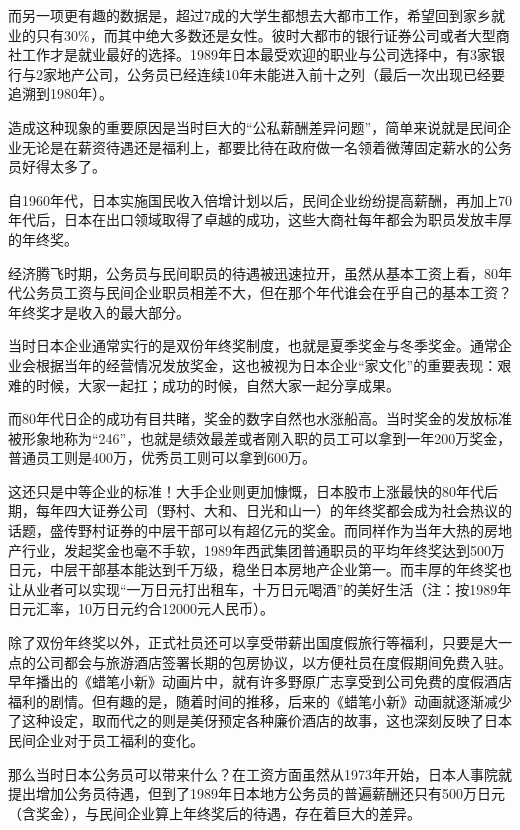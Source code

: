 而另一项更有趣的数据是，超过7成的大学生都想去大都市工作，希望回到家乡就业的只有30\%，而其中绝大多数还是女性。彼时大都市的银行证券公司或者大型商社工作才是就业最好的选择。1989年日本最受欢迎的职业与公司选择中，有3家银行与2家地产公司，公务员已经连续10年未能进入前十之列（最后一次出现已经要追溯到1980年）。

造成这种现象的重要原因是当时巨大的“公私薪酬差异问题”，简单来说就是民间企业无论是在薪资待遇还是福利上，都要比待在政府做一名领着微薄固定薪水的公务员好得太多了。

自1960年代，日本实施国民收入倍增计划以后，民间企业纷纷提高薪酬，再加上70年代后，日本在出口领域取得了卓越的成功，这些大商社每年都会为职员发放丰厚的年终奖。

经济腾飞时期，公务员与民间职员的待遇被迅速拉开，虽然从基本工资上看，80年代公务员工资与民间企业职员相差不大，但在那个年代谁会在乎自己的基本工资？年终奖才是收入的最大部分。

当时日本企业通常实行的是双份年终奖制度，也就是夏季奖金与冬季奖金。通常企业会根据当年的经营情况发放奖金，这也被视为日本企业“家文化”的重要表现：艰难的时候，大家一起扛；成功的时候，自然大家一起分享成果。

而80年代日企的成功有目共睹，奖金的数字自然也水涨船高。当时奖金的发放标准被形象地称为“246”，也就是绩效最差或者刚入职的员工可以拿到一年200万奖金，普通员工则是400万，优秀员工则可以拿到600万。

这还只是中等企业的标准！大手企业则更加慷慨，日本股市上涨最快的80年代后期，每年四大证券公司（野村、大和、日光和山一）的年终奖都会成为社会热议的话题，盛传野村证券的中层干部可以有超亿元的奖金。而同样作为当年大热的房地产行业，发起奖金也毫不手软，1989年西武集团普通职员的平均年终奖达到500万日元，中层干部基本能达到千万级，稳坐日本房地产企业第一。而丰厚的年终奖也让从业者可以实现“一万日元打出租车，十万日元喝酒”的美好生活（注：按1989年日元汇率，10万日元约合12000元人民币）。

除了双份年终奖以外，正式社员还可以享受带薪出国度假旅行等福利，只要是大一点的公司都会与旅游酒店签署长期的包房协议，以方便社员在度假期间免费入驻。早年播出的《蜡笔小新》动画片中，就有许多野原广志享受到公司免费的度假酒店福利的剧情。但有趣的是，随着时间的推移，后来的《蜡笔小新》动画就逐渐减少了这种设定，取而代之的则是美伢预定各种廉价酒店的故事，这也深刻反映了日本民间企业对于员工福利的变化。

那么当时日本公务员可以带来什么？在工资方面虽然从1973年开始，日本人事院就提出增加公务员待遇，但到了1989年日本地方公务员的普遍薪酬还只有500万日元（含奖金），与民间企业算上年终奖后的待遇，存在着巨大的差异。


